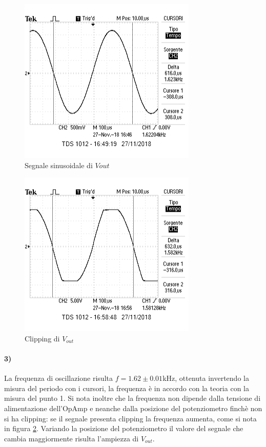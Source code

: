\documentclass{article}
\begin{document}
\begin{figure}
	\centering
	\includegraphics[width=0.6\linewidth]{figure/2sinusoide}
	\caption{Segnale sinusoidale di $V{out}$}
	\label{fig:2sinusoide}
\end{figure}

\begin{figure}
	\centering
	\includegraphics[width=0.6\linewidth]{figure/2clipping}
	\caption{Clipping di $V_{out}$}
	\label{fig:2clipping}
\end{figure}

\paragraph{3)}
La frequenza di oscillazione risulta $f=1.62\pm0.01$kHz, ottenuta invertendo la misura del periodo con i cursori, la frequenza è in accordo con la teoria con la misura del punto 1. Si nota inoltre che la frequenza non dipende dalla tensione di alimentazione dell'OpAmp e neanche dalla posizione del potenziometro finchè non si ha clipping: se il segnale presenta clipping la frequenza aumenta, come si nota in figura \ref{fig:2clipping}. Variando la posizione del potenziometro il valore del segnale che cambia maggiormente risulta l'ampiezza di $V_{out}$.
\end{document}
